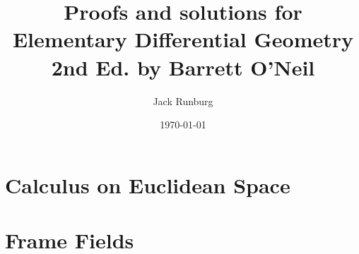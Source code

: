 \documentclass{report}
\begin{document}
\title{Proofs and solutions for Elementary Differential Geometry 2nd Ed. by Barrett O'Neil}
\author{Jack Runburg}
\date{\today}

\maketitle

\tableofcontents

\chapter{Calculus on Euclidean Space}

\chapter{Frame Fields}
\end{document}
